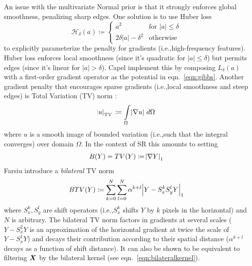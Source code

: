 An issue with the multivariate Normal prior is that it strongly enforces global smoothness, penalizing sharp edges.
%
One solution is to use Huber loss \cite{huber1964}
\begin{equation}
    \mathcal{H}_{\delta }(a)\coloneqq {
        \begin{cases}
            a^2                                 & \text{for }\lvert a \rvert \leq \delta \\
            2 \delta \lvert a \rvert - \delta^2 & {\text{otherwise}}
        \end{cases}
    }
\end{equation}
to explicitly parameterize the penalty for gradients (i.e.,high-frequency features).
%
Huber loss enforces local smoothness (since it's quadratic for \(\lvert a \rvert \leq \delta\)) but permits edges (since it's linear for \(\lvert a \rvert > \delta\)).
%
Capel \etal \cite{capel2000} implement this by composing \(L_{\delta }(a)\) with a first-order gradient operator as the potential in eqn.~\eqref{eqn:gibbs}.
%
Another gradient penalty that encourages sparse gradients (i.e.,local smoothness and steep edges) is Total Variation (TV) norm \cite{RUDIN1992259}:
\begin{equation}
    \abs{u}_{\operatorname {TV}}\,\coloneqq\int\limits _{\Omega }\abs{\nabla u}\,d\Omega
\end{equation}
where \(u\) is a smooth image of bounded variation (i.e.,such that the integral converges) over domain \(\Omega\).
%
In the context of SR this amounts to setting
\begin{equation}
    B(Y) = TV(Y) \coloneqq \abs{ \nabla Y }_1
\end{equation}
%
Farsiu \etal \cite{farsiu} introduce a \textit{bilateral} TV norm
\begin{equation}
    BTV(Y) \coloneqq \sum_{k=0}^{N} \sum_{l=0}^{N} \alpha^{k + l} \abs{ Y - S_x^k S_y^l Y }_1
\end{equation}
where \(S_x^k, S_y^l\) are shift operators (i.e.,\(S_x^k\) shifts \(Y\) by \(k\) pixels in the horizontal) and \(N\) is arbitrary.
%
The bilateral TV norm factors in gradients at several scales (\(Y - S_x^2 Y\) is an approximation of the horizontal gradient at twice the scale of \(Y - S_x^1 Y\)) and decays their contribution according to their spatial distance (\(\alpha^{k+l}\) decays as a function of shift distance).
%
It can also be shown to be equivalent \cite{elad2002} to filtering \(\bm{X}\) by the bilateral kernel (see eqn.~\eqref{eqn:bilateralkernel}).

